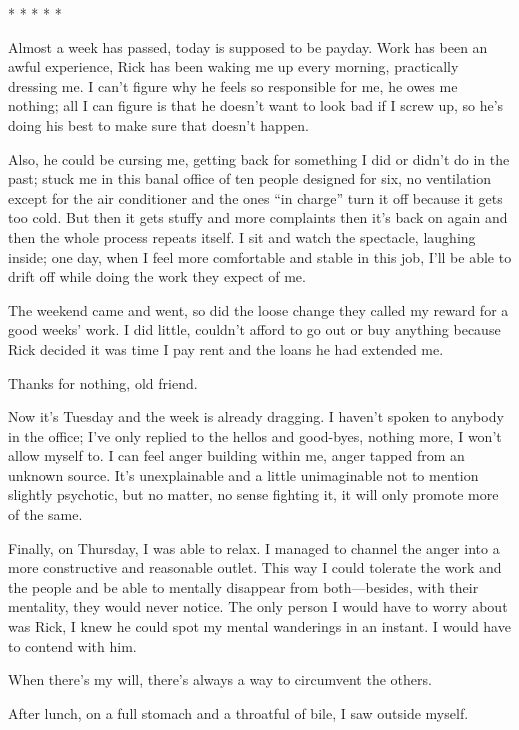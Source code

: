 * * * * *

Almost a week has passed, today is supposed to be payday. Work has been
an awful experience, Rick has been waking me up every morning,
practically dressing me. I can't figure why he feels so responsible for
me, he owes me nothing; all I can figure is that he doesn't want to look
bad if I screw up, so he's doing his best to make sure that doesn't
happen.

Also, he could be cursing me, getting back for something I did or didn't
do in the past; stuck me in this banal office of ten people designed for
six, no ventilation except for the air conditioner and the ones ``in
charge'' turn it off because it gets too cold. But then it gets stuffy
and more complaints then it's back on again and then the whole process
repeats itself. I sit and watch the spectacle, laughing inside; one day,
when I feel more comfortable and stable in this job, I'll be able to
drift off while doing the work they expect of me.

The weekend came and went, so did the loose change they called my reward
for a good weeks' work. I did little, couldn't afford to go out or buy
anything because Rick decided it was time I pay rent and the loans he
had extended me.

Thanks for nothing, old friend.

Now it's Tuesday and the week is already dragging. I haven't spoken to
anybody in the office; I've only replied to the hellos and good-byes,
nothing more, I won't allow myself to. I can feel anger building within
me, anger tapped from an unknown source. It's unexplainable and a little
unimaginable not to mention slightly psychotic, but no matter, no sense
fighting it, it will only promote more of the same.

Finally, on Thursday, I was able to relax. I managed to channel the
anger into a more constructive and reasonable outlet. This way I could
tolerate the work and the people and be able to mentally disappear from
both---besides, with their mentality, they would never notice. The only
person I would have to worry about was Rick, I knew he could spot my
mental wanderings in an instant. I would have to contend with him.

When there's my will, there's always a way to circumvent the others.

After lunch, on a full stomach and a throatful of bile, I saw outside
myself.

